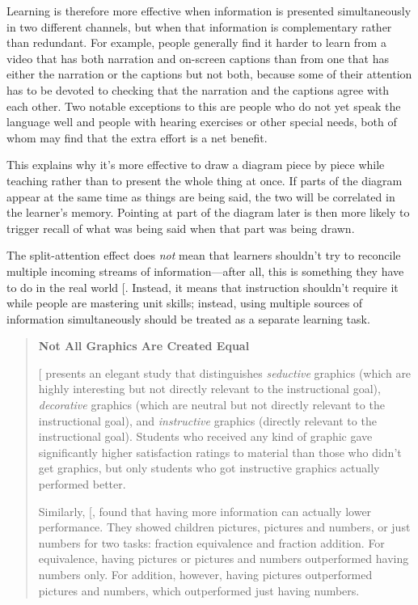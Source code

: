Learning is therefore more effective when information is presented
simultaneously in two different channels, but when that information is
complementary rather than redundant. For example, people generally find
it harder to learn from a video that has both narration and on-screen
captions than from one that has either the narration or the captions but
not both, because some of their attention has to be devoted to checking
that the narration and the captions agree with each other. Two notable
exceptions to this are people who do not yet speak the language well and
people with hearing exercises or other special needs, both of whom may
find that the extra effort is a net benefit.

This explains why it's more effective to draw a diagram piece by piece
while teaching rather than to present the whole thing at once. If parts
of the diagram appear at the same time as things are being said, the two
will be correlated in the learner's memory. Pointing at part of the
diagram later is then more likely to trigger recall of what was being
said when that part was being drawn.

The split-attention effect does \emph{not} mean that learners shouldn't try
to reconcile multiple incoming streams of information---after all, this is
something they have to do in the real world {[}\protect[\hyperlink{b:Atki2000}{Atki2000}]{]}. Instead,
it means that instruction shouldn't require it while people are
mastering unit skills; instead, using multiple sources of information
simultaneously should be treated as a separate learning task.

\begin{quote}\setlength{\parindent}{0pt}
\textbf{Not All Graphics Are Created Equal}

{[}\protect[\hyperlink{b:Sung2012}{Sung2012}]{]} presents an elegant study that distinguishes
\emph{seductive} graphics (which are highly interesting but not directly
relevant to the instructional goal), \emph{decorative} graphics (which are
neutral but not directly relevant to the instructional goal), and
\emph{instructive} graphics (directly relevant to the instructional goal).
Students who received any kind of graphic gave significantly higher
satisfaction ratings to material than those who didn't get graphics,
but only students who got instructive graphics actually performed
better.

Similarly, {[},\protect[\hyperlink{b:Stam2014}{Stam2014}]{]} found that having more
information can actually lower performance. They showed children
pictures, pictures and numbers, or just numbers for two tasks:
fraction equivalence and fraction addition. For equivalence, having
pictures or pictures and numbers outperformed having numbers only. For
addition, however, having pictures outperformed pictures and numbers,
which outperformed just having numbers.
\end{quote}

